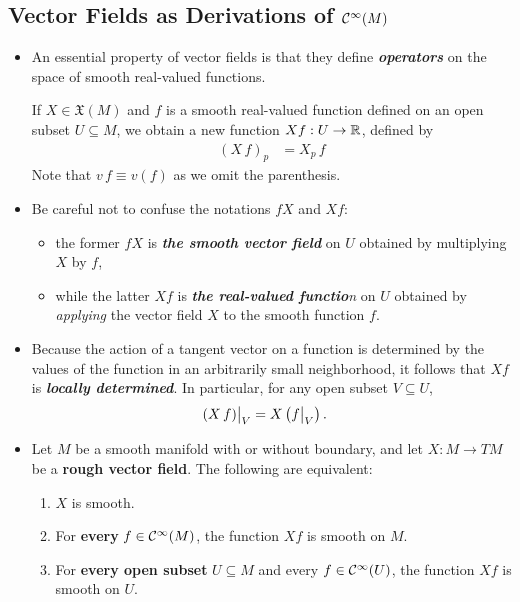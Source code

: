 \documentclass[11pt]{article}
\begin{document}
\subsection{Vector Fields as Derivations of ${\mathcal C}^{\infty}(M)$}
\begin{itemize}
\item An essential property of vector fields is that they define \emph{\textbf{operators}} on the space of smooth real-valued functions.

\begin{definition}
 If $X \in \mathfrak{X}(M)$ and $f$ is a smooth real-valued function defined on an open subset $U \subseteq M$, we obtain a new function $Xf:  U \rightarrow {\mathbb R}$, defined
by 
\begin{align*}
(X\,f)_{p} &=  X_{p}\,f
\end{align*} Note that $v\,f \equiv v(f)$ as we omit the parenthesis.
\end{definition}

\item \begin{remark}
Be careful not to confuse the notations $fX$ and $Xf$:
\begin{itemize}
\item  the former $fX$ is \emph{\textbf{the smooth vector field}} on $U$ obtained by multiplying $X$ by $f$,
\item  while the latter $Xf$ is \emph{\textbf{the real-valued functio}n} on $U$ obtained by \emph{applying} the vector field $X$ to the smooth function $f$.
\end{itemize}
\end{remark}

\item \begin{remark}
Because the action of a tangent vector on a function is determined by the values of the function in an arbitrarily small neighborhood, it follows that $Xf$ is \emph{\textbf{locally determined}}. In particular,  for any open subset $V \subseteq U$, 
\begin{align}
(X\,f)\bigr|_{V} &= X\left(f \bigr|_{V}\right).  \label{eqn: local_vector_field_on_function}
\end{align}
\end{remark}

\item \begin{proposition}
Let $M$ be a smooth manifold with or without boundary, and let $X: M \rightarrow TM$ be a \textbf{rough vector field}. The following are equivalent:
\begin{enumerate}
\item  $X$ is smooth.
\item  For \textbf{every} $f \in {\mathcal C}^{\infty}(M)$,  the function $Xf$ is smooth on $M$.
\item For \textbf{every open subset} $U \subseteq M$ and every $f \in {\mathcal C}^{\infty}(U)$, the function $Xf$ is smooth on $U$.
\end{enumerate}
\end{proposition}


\end{itemize}
\end{document}

